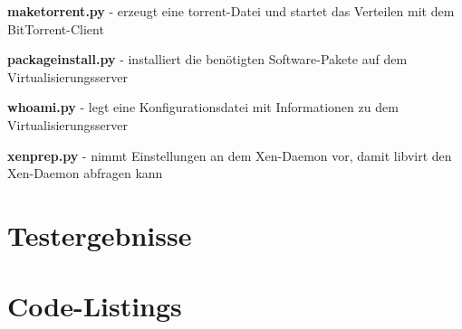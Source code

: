 \textbf{maketorrent.py}
- erzeugt eine torrent-Datei und startet das Verteilen mit dem BitTorrent-Client

\textbf{packageinstall.py}
- installiert die benötigten Software-Pakete auf dem Virtualisierungsserver

\textbf{whoami.py}
- legt eine Konfigurationsdatei mit Informationen zu dem Virtualisierungsserver

\textbf{xenprep.py}
- nimmt Einstellungen an dem Xen-Daemon vor, damit libvirt den Xen-Daemon abfragen kann 
\newpage
\section{Testergebnisse}

\newpage
\section{Code-Listings}













